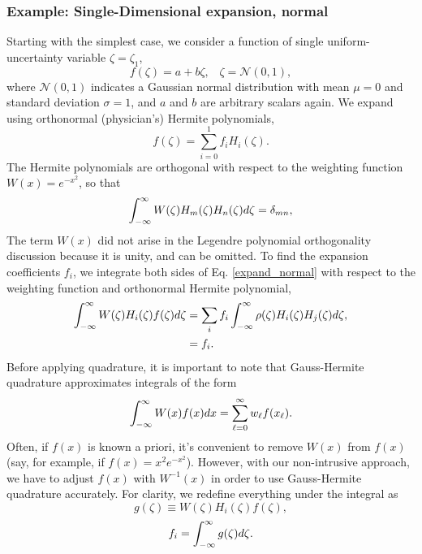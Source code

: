 \subsubsection{Example: Single-Dimensional expansion, normal}
Starting with the simplest case, we consider a function of single uniform-uncertainty variable $\zeta=\zeta_1$,
\begin{equation}
f(\zeta)=a+b\zeta, \hspace{10pt}\zeta=\mathcal{N}(0,1),
\end{equation}
where $\mathcal{N}(0,1)$ indicates a Gaussian normal distribution with mean $\mu=0$ and standard deviation $\sigma=1$, and $a$ and $b$ are arbitrary scalars again.  We expand using orthonormal (physician's) Hermite polynomials,
\begin{equation}\label{expand_normal}
f(\zeta)=\sum_{i=0}^1 f_i H_i(\zeta).
\end{equation}
The Hermite polynomials are orthogonal with respect to the weighting function $W(x)=e^{-x^2}$, so that
\begin{equation}
\int_{-\infty}^\infty W(\zeta) H_m(\zeta) H_n(\zeta) d\zeta = \delta_{mn},
\end{equation}
The term $W(x)$ did not arise in the Legendre polynomial orthogonality discussion because it is unity, and can be omitted.  To find the expansion coefficients $f_i$, we integrate both sides of Eq. \ref{expand_normal} with respect to the weighting function and orthonormal Hermite polynomial,
\begin{align}
\int_{-\infty}^\infty W(\zeta)H_i(\zeta) f(\zeta) d\zeta &= \sum_{i}f_i\int_{-\infty}^\infty \rho(\zeta) H_i(\zeta)H_j(\zeta)d\zeta,\\
  &= f_i.
\end{align}
Before applying quadrature, it is important to note that Gauss-Hermite quadrature approximates integrals of the form
\begin{equation}
\int_{-\infty}^\infty W(x) f(x) dx = \sum_{\ell=0}^\infty w_\ell f(x_\ell).
\end{equation}
Often, if $f(x)$ is known a priori, it's convenient to remove $W(x)$ from $f(x)$ (say, for example, if $f(x)=x^2 e^{-x^2}$).  However, with our non-intrusive approach, we have to adjust $f(x)$ with $W^{-1}(x)$ in order to use Gauss-Hermite quadrature accurately.  For clarity, we redefine everything under the integral as
\begin{equation}
g(\zeta)\equiv W(\zeta)H_i(\zeta)f(\zeta),
\end{equation}
\begin{equation}
f_i = \int_{-\infty}^\infty g(\zeta)d\zeta.
\end{equation}
